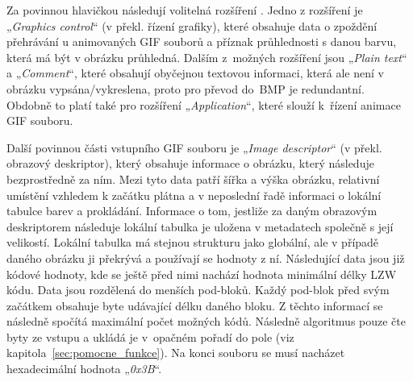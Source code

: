 \documentclass[a4paper,12pt,times]{article}
\begin{document}
Za povinnou hlavičkou následují volitelná rozšíření \cite{whatsinagif}. Jedno z rozšíření je „\textit{Graphics control}“ (v překl. řízení grafiky), které obsahuje data o zpoždění přehrávání u animovaných GIF souborů a příznak průhlednosti s danou barvu, která má být v obrázku průhledná. Dalším z~možných rozšíření jsou „\textit{Plain text}“ a „\textit{Comment}“, které obsahují obyčejnou textovou informaci, která ale není v obrázku vypsána/vykreslena, proto pro převod do~BMP je redundantní. Obdobně to platí také pro rozšíření „\textit{Application}“, které slouží k~řízení animace GIF souboru.

Další povinnou části vstupního GIF souboru je „\textit{Image descriptor}“ (v překl. obrazový deskriptor), který obsahuje informace o obrázku, který následuje bezprostředně za ním. Mezi tyto data patří šířka a výška obrázku, relativní umístění vzhledem k začátku plátna a v neposlední řadě informaci o lokální tabulce barev a prokládání. Informace o tom, jestliže za daným obrazovým deskriptorem následuje lokální tabulka je uložena v metadatech společně s její velikostí. Lokální tabulka má stejnou strukturu jako globální, ale v případě daného obrázku ji překrývá a používají se hodnoty z ní. Následující data jsou již kódové hodnoty, kde se ještě před nimi nachází hodnota minimální délky LZW kódu. Data jsou rozdělená do menších pod-bloků. Každý pod-blok před svým začátkem obsahuje byte udávající délku daného bloku. Z těchto informací se následně spočítá maximální počet možných kódů. Následně algoritmus pouze čte byty ze vstupu a ukládá je v~opačném pořadí do pole (viz kapitola~\ref{sec:pomocne_funkce}). Na konci souboru se musí nacházet hexadecimální hodnota „\textit{0x3B}“.
\end{document}
